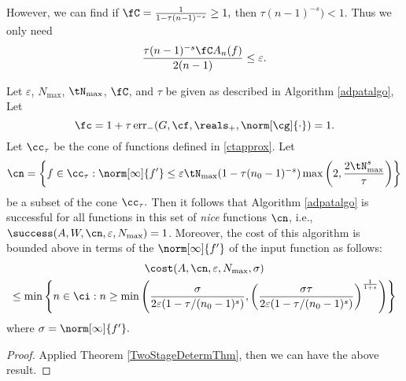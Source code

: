 However, we can find if $\fC =\frac{1}{1 - \tau (n-1)^{-s}} \ge 1,$ then $\tau (n-1)^{-s}) <1.$
Thus we only need \[
\frac{\tau (n-1)^{-s}\fC A_{n}(f)}{2(n-1)} \le \varepsilon.
\]


\begin{theorem}   Let  $\varepsilon$, $N_{\max}$, $\tN_{\max}$, $\fC$, and $\tau$ be given as described in Algorithm \ref{adpatalgo},  Let
$$
\fc =1 + \tau \err_{-}(G,\cf,\reals_+,\norm[\cg]{\cdot}) =1.
$$
Let $\cc_\tau$ be the cone of functions defined in \eqref{ctapprox}.  Let
$$
\cn = \left \{ f \in \cc_\tau : \norm[\infty]{f'} \le \varepsilon \tN_{\max}(1 - \tau (n_0-1)^{-s}) \max\left( 2, \frac{2\tN_{\max}^{s}}{\tau} \right ) \right\}
$$
be a subset of the cone $\cc_\tau.$  Then it follows that Algorithm \ref{adpatalgo} is successful for all functions in this set of \emph{nice} functions $\cn$,  i.e.,  $\success(A,W,\cn,\varepsilon,N_{\max}) = 1$.  Moreover, the cost of this algorithm is bounded above in terms of the $\norm[\infty]{f'}$ of the input function as follows:
\begin{multline}
\cost(A,\cn,\varepsilon,N_{\max},\sigma) \\
\le  \min\left\{ n \in \ci : n \ge \min\left( \frac{\sigma}{2\varepsilon(1 - \tau/(n_{0}-1)^{s})} , \left(\frac{\sigma\tau}{2\varepsilon(1 - \tau/(n_{0}-1)^{s})}\right)^{\frac{1}{1+s}}\right)  \right\}
\end{multline} where $\sigma=\norm[\infty]{f'}.$

\end{theorem}

\begin{proof}
Applied Theorem \ref{TwoStageDetermThm}, then we can have the above result.
\end{proof}

